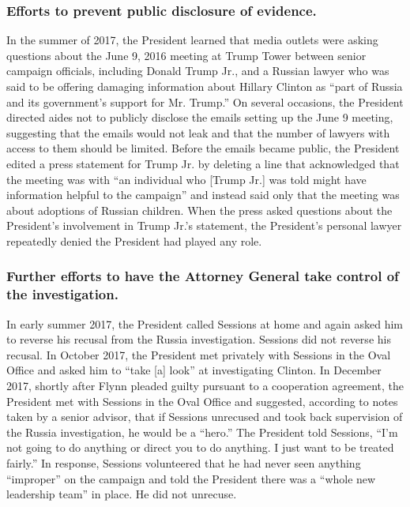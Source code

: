 \subsubsection*{Efforts to prevent public disclosure of evidence.}

In the summer of 2017, the President learned that media outlets were asking questions about the June 9, 2016 meeting at Trump Tower between senior campaign officials, including Donald Trump Jr., and a Russian lawyer who was said to be offering damaging information about Hillary Clinton as “part of Russia and its government’s support for Mr. Trump.”
On several occasions, the President directed aides not to publicly disclose the emails setting up the June 9 meeting, suggesting that the emails would not leak and that the number of lawyers with access to them should be limited.
Before the emails became public, the President edited a press statement for Trump Jr. by deleting a line that acknowledged that the meeting was with “an individual who [Trump Jr.] was told might have information helpful to the campaign” and instead said only that the meeting was about adoptions of Russian children.
When the press asked questions about the President’s involvement in Trump Jr.’s statement, the President’s personal lawyer repeatedly denied the President had played any role.

\subsubsection*{Further efforts to have the Attorney General take control of the investigation.}

In early summer 2017, the President called Sessions at home and again asked him to reverse his recusal from the Russia investigation. Sessions did not reverse his recusal.
In October 2017, the President met privately with Sessions in the Oval Office and asked him to “take [a] look” at investigating Clinton.
In December 2017, shortly after Flynn pleaded guilty pursuant to a cooperation agreement, the President met with Sessions in the Oval Office and suggested, according to notes taken by a senior advisor, that if Sessions unrecused and took back supervision of the Russia investigation, he would be a “hero.”
The President told Sessions, “I’m not going to do anything or direct you to do anything.
I just want to be treated fairly.”
In response, Sessions volunteered that he had never seen anything “improper” on the campaign and told the President there was a “whole new leadership team” in place.
He did not unrecuse.

